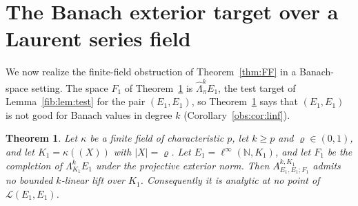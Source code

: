 \documentclass[11pt]{amsart}
\newtheorem{theorem}{Theorem}[section]
\theoremstyle{definition}
\theoremstyle{remark}
\numberwithin{equation}{section}
\newcommand{\N}{\mathbb N}
\newcommand{\cL}{\mathcal L}
\newcommand{\linf}{\ell^\infty}
\newcommand{\abs}[1]{\lvert #1\rvert}
\theoremstyle{plain}
\theoremstyle{definition}
\theoremstyle{plain}
\begin{document}
\section{The Banach exterior target over a Laurent series field}\label{app:laurent}\label{sec:laurent}

We now realize the finite-field obstruction of Theorem~\ref{thm:FF} in a Banach-space setting.
The space $F_1$ of Theorem~\ref{thm:laurent} is $\widehat\Lambda^k_\pi E_1$, the test target of
Lemma~\ref{fib:lem:test} for the pair $(E_1,E_1)$, so Theorem~\ref{thm:laurent} says that $(E_1,E_1)$ is not good for
Banach values in degree $k$ (Corollary~\ref{obs:cor:linf}).

\begin{theorem}\label{thm:laurent}
Let $\kappa$ be a finite field of characteristic $p$, let $k\ge p$ and $\varrho\in(0,1)$, and let $K_1=\kappa((X))$ with
$\abs X=\varrho$. Let $E_1=\linf(\N,K_1)$, and let $F_1$ be the completion of $\Lambda^k_{K_1}E_1$ under the projective exterior
norm. Then $A^{k,K_1}_{E_1,E_1;F_1}$ admits no bounded $k$\nobreakdash-linear lift over $K_1$. Consequently it is analytic at no point of
$\cL(E_1,E_1)$.
\end{theorem}
\end{document}

